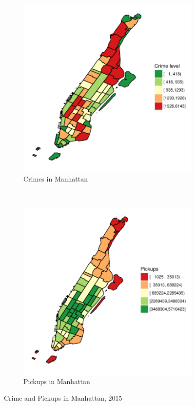 \documentclass{sigkddExp}
\begin{document}
\begin{figure}
    \centering
    \begin{subfigure}[t]{0.5\textwidth}
        \centering
        \includegraphics[width=.9\textwidth]{../img/crimes_per_zone_2015_Manhattan}
        \caption{Crimes in Manhattan}
    \end{subfigure}%
    ~ 
    \begin{subfigure}[t]{0.5\textwidth}
        \centering
        \includegraphics[width=.9\textwidth]{../img/taxis_2015_Manhattan}
        \caption{Pickups in Manhattan}
    \end{subfigure}
    \caption{Crime and Pickups in Manhattan, 2015}
    \label{Manhattan}
  \end{figure}
\end{document}
